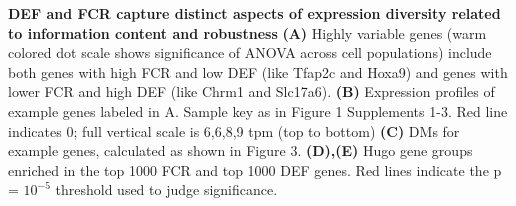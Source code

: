 \textbf{DEF and FCR capture distinct aspects of expression diversity related to information content and robustness} \textbf{(A)} Highly variable genes (warm colored dot scale shows significance of ANOVA across cell populations) include both genes with high FCR and low DEF (like Tfap2c and Hoxa9) and genes with lower FCR and high DEF (like Chrm1 and Slc17a6). \textbf{(B)} Expression profiles of example genes labeled in A. Sample key as in Figure 1 Supplements 1-3. Red line indicates 0; full vertical scale is 6,6,8,9 tpm (top to bottom) \textbf{(C)} DMs for example genes, calculated as shown in Figure 3. \textbf{(D),(E)} Hugo gene groups enriched in the top 1000 FCR and top 1000 DEF genes. Red lines indicate the p = $10^{-5}$ threshold used to judge significance.